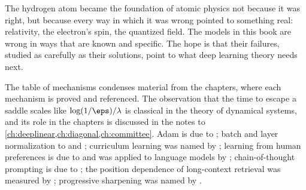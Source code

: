 \begin{refsection}
The hydrogen atom became the foundation of atomic physics not because it was right, but because every way in which it was wrong pointed to something real: relativity, the electron's spin, the quantized field. The models in this book are wrong in ways that are known and specific. The hope is that their failures, studied as carefully as their solutions, point to what deep learning theory needs next.

\notesandrefs

The table of mechanisms condenses material from the chapters, where each mechanism is proved and referenced. The observation that the time to escape a saddle scales like $\log(1/\eps)/\lambda$ is classical in the theory of dynamical systems, and its role in the chapters is discussed in the notes to \cref{ch:deeplinear,ch:diagonal,ch:committee}. Adam is due to \textcite{KingmaBa2015}; batch and layer normalization to \textcite{IoffeSzegedy2015} and \textcite{BaKirosHinton2016}; curriculum learning was named by \textcite{BengioEtAl2009}; learning from human preferences is due to \textcite{ChristianoEtAl2017} and was applied to language models by \textcite{OuyangEtAl2022}; chain-of-thought prompting is due to \textcite{WeiEtAl2022}; the position dependence of long-context retrieval was measured by \textcite{LiuEtAl2024}; progressive sharpening was named by \textcite{CohenEtAl2021}.

\printchapterbib
\end{refsection}

